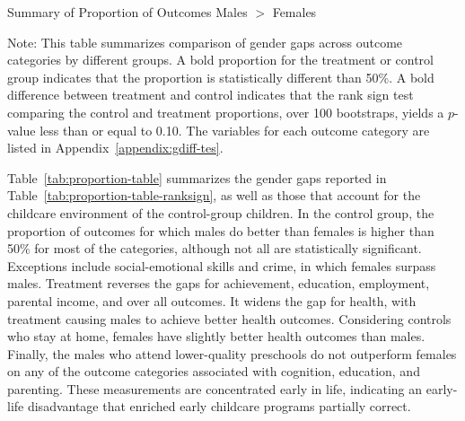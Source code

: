 \begin{table}[H]
\centering
\caption{Summary of Proportion of Outcomes Males $>$ Females}
\label{tab:proportion-table-ranksign}
\begin{threeparttable}

\begin{tablenotes}
\footnotesize
\item Note: This table summarizes comparison of gender gaps across outcome categories by different groups. A bold proportion for the treatment or control group indicates that the proportion is statistically different than 50\%. A bold difference between treatment and control indicates that the rank sign test comparing the control and treatment proportions, over 100 bootstraps, yields a $p$-value less than or equal to 0.10. The variables for each outcome category are listed in Appendix~\ref{appendix:gdiff-tes}.
\end{tablenotes}
\end{threeparttable}
\end{table}


Table~\ref{tab:proportion-table} summarizes the gender gaps reported in Table~\ref{tab:proportion-table-ranksign}, as well as those that account for the childcare environment of the control-group children. In the control group, the proportion of outcomes for which males do better than females is higher than 50\% for most of the categories, although not all are statistically significant. Exceptions include social-emotional skills and crime, in which females surpass males. Treatment reverses the gaps for achievement, education, employment, parental income, and over all outcomes. It widens the gap for health, with treatment causing males to achieve better health outcomes. Considering controls who stay at home, females have slightly better health outcomes than males. Finally, the males who attend lower-quality preschools do not outperform females on any of the outcome categories associated with cognition, education, and parenting. These measurements are concentrated early in life, indicating an early-life disadvantage that enriched early childcare programs partially correct.


